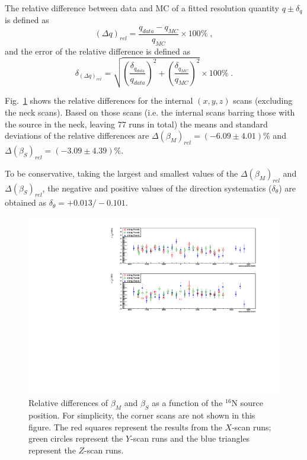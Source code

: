The relative difference between data and MC of a fitted resolution quantity $q\pm \delta_q$ is defined as
\begin{equation}
(\Delta q)_{rel} = \frac{q_{data}-q_{MC}}{q_{MC}}\times 100\%\;,
\end{equation}
and the error of the relative difference is defined as 
\begin{equation}
\delta_{(\Delta q)_{rel}} = \sqrt{(\frac{\delta_{q_{data}}}{q_{data}})^2+(\frac{\delta_{q_{MC}}}{q_{MC}})^2}\times 100\% \; .
\end{equation}\label{eq:erors_relativeBiases}

Fig.~\ref{relative_biasesVsPositions} shows the relative differences for the internal $(x, y, z)$ scans (excluding the neck scans). Based on those scans (i.e. the internal scans barring those with the source in the neck, leaving 77 runs in total) the means and standard deviations of the relative differences are $\Delta(\beta_M)_{rel}=(-6.09\pm4.01)\%$ and $\Delta(\beta_S)_{rel}=(-3.09\pm4.39)\%$.

To be conservative, taking the largest and smallest values of the $\Delta(\beta_M)_{rel}$ and $\Delta(\beta_S)_{rel}$, the negative and positive values of the direction systematics ($\delta_\theta$) are obtained as $\delta_\theta=+0.013/-0.101$.

\begin{figure}[!htb]
	\centering
	\includegraphics[width=16cm]{angularResol_scanXYZ.pdf}
	\caption[Relative differences of $\beta_M$ and $\beta_S$ as a function of the $^{16}$N source position.]{Relative differences of $\beta_M$ and $\beta_S$ as a function of the $^{16}$N source position. For simplicity, the corner scans are not shown in this figure. The red squares represent the results from the $X$-scan runs; green circles represent the $Y$-scan runs and the blue triangles represent the $Z$-scan runs. \label{relative_biasesVsPositions}}
\end{figure}

